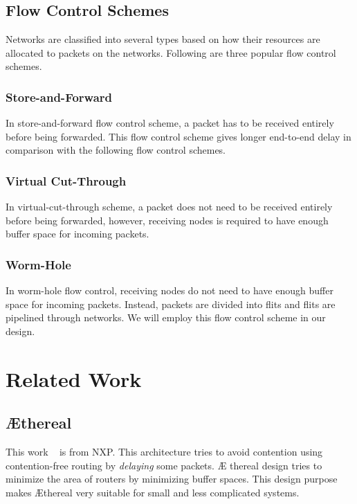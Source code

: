 \documentclass[conference, twocolumn]{IEEEtran}
\theoremstyle{definition}
\begin{document}
\subsection{Flow Control Schemes}
Networks are classified into several types based on how their resources are
allocated to packets on the networks. Following are three popular flow control
schemes.
\subsubsection{Store-and-Forward}
In store-and-forward flow control scheme, a packet has to be received entirely
before being forwarded. This flow control scheme gives longer end-to-end delay
in comparison with the following flow control schemes.
\subsubsection{Virtual Cut-Through}
In virtual-cut-through scheme, a packet does not need to be received entirely
before being forwarded, however, receiving nodes is required to have enough
buffer space for incoming packets.
\subsubsection{Worm-Hole}
In worm-hole flow control, receiving nodes do not need to have enough buffer
space for incoming packets. Instead, packets are divided into flits and flits
are pipelined through networks. We will employ this flow control scheme in our
design.
\section{Related Work}
\subsection{\AE thereal}
This work ~\cite{Goossens_chapter4} is from NXP. This architecture tries to
avoid contention using contention-free routing by {\em delaying} some packets. \AE
thereal design tries to minimize the area of routers by minimizing buffer
spaces. This design purpose makes \AE thereal very suitable for small and less
complicated systems.
\end{document}
